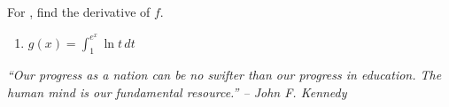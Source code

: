 \documentclass{book}
\newcommand{\dt}{\,dt}
\newcommand{\dtheta}{\,d\theta}
\newcommand{\dint}{\displaystyle \int}
\begin{document}
For , find the derivative of $f$.
\begin{enumerate}[!HW!]
\centerline{\emph{ \color{magenta} Note $\dint_x^a f(t)\dt = -\dint_a^x f(t)\dt$.}}
\begin{multicols}{3}
\itemspade $y = \dint_1^{\tan x} \sqrt{2t + \sqrt{t}}\dt$ 
\itemspade $y=\dint_{4-3x}^1 \dfrac{t^3}{1+t^2}\dt$ 
\itemspade $f(x) = \dint_{2x}^{5x} \dfrac{t^2-1}{t^2+1}\dt$ 
\end{multicols}
\emph{\hfill \color{magenta} $\dint_{u(x)}^{v(x)} f(t)\dt = \dint_{u(x)}^a f(t)\dt + \dint_a^{v(x)} f(t)\dt$ for any $a\in \dom f$}
\item\label{exer:devirativeintegral:stop} $g(x)=\dint_1^{e^x} \ln t\dt$ 
\end{enumerate}
\pagebreak

\begin{center} 
\emph{``Our progress as a nation can be no swifter than our progress in education. The human mind is our fundamental resource.'' -- John F. Kennedy}
\end{center}
\end{document}
